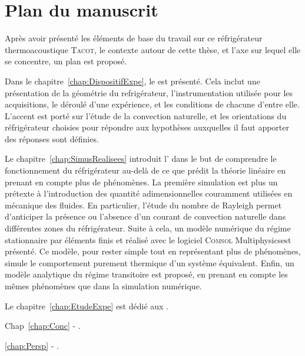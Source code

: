 \section{Plan du manuscrit}
Après avoir présenté les éléments de base du travail sur ce réfrigérateur thermoacoustique \textsc{Tacot}, le contexte autour de cette thèse, et l'axe sur lequel elle se concentre, un plan est proposé.\medskip

Dans le chapitre~\ref{chap:DispositifExpe}, le   est présenté. Cela inclut une présentation de la géométrie du refrigérateur, l'instrumentation utilisée pour les acquisitions, le déroulé d'une expérience, et les conditions de chacune d'entre elle. L'accent est porté sur l'étude de la convection naturelle, et les orientations du réfrigérateur choisies pour répondre aux hypothèses auxquelles il faut apporter des réponses sont définies.\smallskip

Le chapitre~\ref{chap:SimusRealisees} introduit l' dans le but de comprendre le fonctionnement du réfrigérateur au-delà de ce que prédit la théorie linéaire en prenant en compte plus de phénomènes. La première simulation est  plus un prétexte à l'introduction des quantité adimensionnelles couramment utilisées en mécanique des fluides. En particulier, l'étude du nombre de Rayleigh permet d'anticiper la présence ou l'absence d'un courant de convection naturelle dans différentes zones du réfrigérateur. Suite à cela, un modèle numérique du régime stationnaire par éléments finis et réalisé avec le logiciel \textsc{Comsol} Multiphysics\textss\textregistered est présenté. Ce modèle, pour rester simple tout en représentant plus de phénomènes, simule le comportement purement thermique d'un système équivalent. Enfin, un modèle analytique du régime transitoire est proposé, en prenant en compte les mêmes phénomènes que dans la simulation numérique.\smallskip

Le chapitre~\ref{chap:EtudeExpe} est dédié aux . \smallskip

Chap~\ref{chap:Conc} - .\smallskip

\ref{chap:Persp} - .


